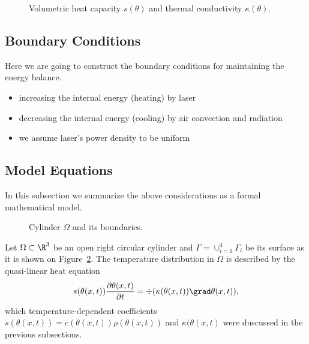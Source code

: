 \begin{figure}[ht]
	\centering
	
	
	\caption{Volumetric heat capacity $s(\theta)$ and thermal conductivity $\kappa(\theta)$.}
	\label{fig:coef}
\end{figure}



\subsection{Boundary Conditions}

Here we are going to construct the boundary conditions for maintaining the energy balance.

\begin{itemize}
	\item increasing the internal energy (heating) by laser
	\item decreasing the internal energy (cooling) by air convection and radiation
	\item we assume laser's power density to be uniform
\end{itemize}

\subsection{Model Equations}
\label{subsec:equations}

In this subsection we summarize the above considerations as a formal mathematical model.

\begin{figure}[ht]
	\centering
	
	\caption{Cylinder $\Omega$ and its boundaries.}
	\label{fig:cylinder}
\end{figure}

Let $\Omega	\subset \R^3$ be an open right circular cylinder and $\Gamma = \cup_{i=1}^4 \Gamma_i$ be its surface as it is shown on Figure~\ref{fig:cylinder}. The temperature distribution in $\Omega$ is described by the quasi-linear heat equation
\begin{equation} \label{eq:heat_eq}
	s(\theta(x,t)) \frac{\partial \theta(x,t)}{\partial t} = \div (\kappa(\theta(x,t)) \grad\theta(x,t)),
\end{equation}
which temperature-dependent coefficients $s(\theta(x,t)) = c(\theta(x,t)) \rho(\theta(x,t))$ and $\kappa(\theta(x,t)$ were duscussed in the previous subsections.

